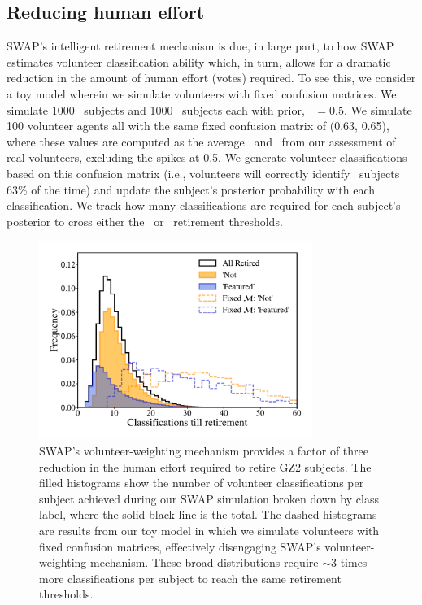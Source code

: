 \subsection{Reducing human effort}\label{chap3: human effort}

SWAP's intelligent retirement mechanism is due, in large part, to how SWAP estimates volunteer classification ability which, in turn, allows for a dramatic reduction in the amount of human effort (votes) required. To see this, we consider a toy model wherein we simulate volunteers with fixed confusion matrices. We simulate 1000 \feat~subjects and 1000 \notfeat~subjects each with prior, \p~$ = 0.5$. We simulate 100 volunteer agents all with the same fixed confusion matrix of (0.63, 0.65), where these values are computed as the average \Pf~and \Pn~from our assessment of real volunteers, excluding the spikes at 0.5. We generate volunteer classifications based on this confusion matrix (i.e., volunteers will correctly identify \feat~subjects 63\% of the time) and update the subject's posterior probability with each classification. We track how many classifications are required for each subject's posterior to cross either the \feat~or \notfeat~retirement thresholds. 


\begin{figure}
\centering
\includegraphics[width=3.5in]{Figures/human_machine/f7.pdf}
\caption[SWAP's volunteer-weighting mechanism provides a factor of three reduction in the required human effort for classification tasks.]{SWAP's volunteer-weighting mechanism provides a factor of three reduction in the human effort required to retire GZ2 subjects. The filled histograms show the number of volunteer classifications per subject achieved during our SWAP simulation broken down by class label, where the solid black line is the total. The dashed histograms are results from our toy model in which we simulate volunteers with fixed confusion matrices, effectively disengaging SWAP's volunteer-weighting mechanism. These broad distributions require $\sim$3 times more classifications per subject to reach the same retirement thresholds.} 
\label{fig: swap vote distributions}
\end{figure}

